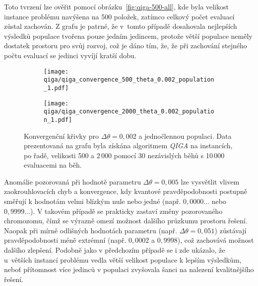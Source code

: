 Toto tvrzení lze ověřit pomocí obrázku~\ref{fig:qiga-500-all}, kde byla velikost instance problému navýšena na 500 položek, zatímco celkový počet evaluací zůstal zachován. 
Z grafu je patrné, že v~tomto případě dosahovala nejlepších výsledků populace tvořena pouze jedním jedincem, protože větší populace neměly dostatek prostoru pro svůj rozvoj, což je dáno tím, že, že při zachování stejného počtu evaluací se jedinci vyvíjí kratší dobu. 

\begin{figure}[ht!]
    \centering
    \begin{subfigure}[b]{0.48\textwidth}
      \texttt{[image: qiga/qiga\_convergence\_500\_theta\_0.002\_population\_1.pdf]}
    \end{subfigure}
    \hfill
    \begin{subfigure}[b]{0.48\textwidth}
        \texttt{[image: qiga/qiga\_convergence\_2000\_theta\_0.002\_population\_1.pdf]}
    \end{subfigure}
    \caption{Konvergenční křivky pro $\Delta\theta = 0,002$ a jednočlennou populaci. Data prezentovaná na grafu byla získána algoritmem \emph{QIGA} na instancích, po řadě, velikosti 500 a 2\,000 pomocí 30 nezávislých běhů s 10\,000 evaluacemi na běh.}
    \label{fig:qiga-convergence}
\end{figure}

Anomálie pozorovaná při hodnotě parametru $\Delta\theta = 0,005$ lze vysvětlit vlivem zaokrouhlovacích chyb a konvergence, kdy kvantové pravděpodobnosti postupně směřují k hodnotám velmi blízkým nule nebo jedné (např. $0,0000\dots$ nebo $0,9999\dots$). 
V takovém případě se prakticky zastaví změny pozorovaného chromozomu, čímž se výrazně omezí možnost dalšího průzkumu prostoru řešení.  
Naopak při mírně odlišných hodnotách parametru (např. $\Delta\theta = 0,051$) zůstávají pravděpodobnosti méně extrémní (např. $0,0002$ a $0,9998$), což zachovává možnost dalšího zlepšení. 
Podobně jako v předchozím případě se i zde ukázalo, že u~větších instancí problému vedla větší velikost populace k lepším výsledkům, neboť přítomnost více jedinců v populaci zvyšovala šanci na nalezení kvalitnějšího řešení.

